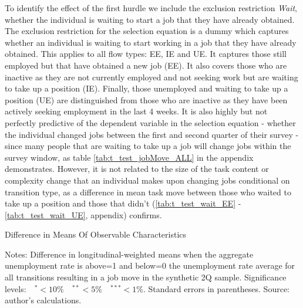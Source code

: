 \documentclass[12pt,authoryear]{elsarticle}
\begin{document}
To identify the effect of the first hurdle we include the exclusion restriction \textit{Wait}, whether the individual is waiting to start a job that they have already obtained. The exclusion restriction for the selection equation is a dummy which captures whether an individual is waiting to start working in a job that they have already obtained. This applies to all flow types: EE, IE and UE. It captures those still employed but that have obtained a new job (EE). It also covers those who are inactive as they are not currently employed and not seeking work but are waiting to take up a position (IE). Finally, those unemployed and waiting to take up a position (UE) are distinguished from those who are inactive as they have been actively seeking employment in the last 4 weeks. It is also highly but not perfectly predictive of the dependent variable in the selection equation - whether the individual changed jobs between the first and second quarter of their survey - since many people that are waiting to take up a job will change jobs within the survey window, as table \ref{tab:t_test_jobMove_ALL} in the appendix demonstrates. However, it is not related to the size of the task content or complexity change that an individual makes upon changing jobs conditional on transition type, as a difference in mean task move between those who waited to take up a position and those that didn't (\ref{tab:t_test_wait_EE} - \ref{tab:t_test_wait_UE}, appendix) confirms.


	\newpage
\thispagestyle{empty}
\begin{table}[H]
	\centering
	\caption{Difference in Means Of Observable Characteristics}\label{tab:diffMeans}
	\begin{adjustbox}{max width=16cm, max height=10cm}
		\begin{threeparttable}
			
			\begin{tablenotes}
				\item \footnotesize{Notes: Difference in longitudinal-weighted means when the aggregate unemployment rate is above=1 and below=0 the unemployment rate average for all transitions resulting in a job move in the synthetic 2Q sample. Significance levels:$ \quad ^{*}<10\% \quad ^{**}<5\% \quad ^{***}<1\%$. Standard errors in parentheses. Source: author's calculations.}  
			\end{tablenotes}
		\end{threeparttable}
	\end{adjustbox}
\end{table}
\end{document}

